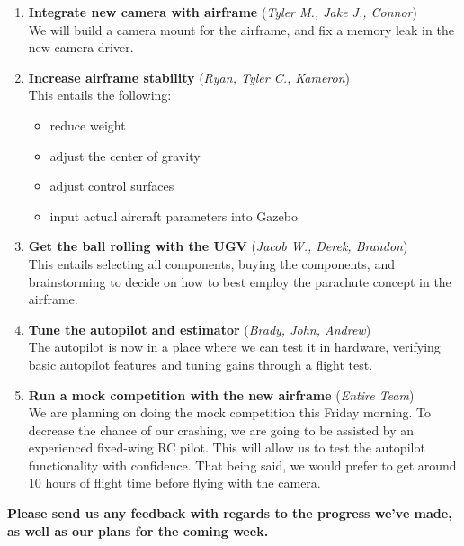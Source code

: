 \documentclass[]{../auvsi_doc}
\begin{document}
\begin{enumerate}
	\item \textbf{Integrate new camera with airframe} (\textit{Tyler M., Jake J., Connor}) \\
	We will build a camera mount for the airframe, and fix a memory leak in the new camera driver.
	\item \textbf{Increase airframe stability} (\textit{Ryan, Tyler C., Kameron}) \\
	This entails the following:
	\begin{itemize}
		\item reduce weight
		\item adjust the center of gravity
		\item adjust control surfaces
		\item input actual aircraft parameters into Gazebo
	\end{itemize}
	\item \textbf{Get the ball rolling with the UGV} (\textit{Jacob W., Derek, Brandon}) \\
	This entails selecting all components, buying the components, and brainstorming to decide on how to best employ the parachute concept in the airframe.
	\item \textbf{Tune the autopilot and estimator} (\textit{Brady, John, Andrew}) \\
	The autopilot is now in a place where we can test it in hardware, verifying basic autopilot features and tuning gains through a flight test.
	\item \textbf{Run a mock competition with the new airframe} (\textit{Entire Team}) \\
	We are planning on doing the mock competition this Friday morning. To decrease the chance of our crashing, we are going to be assisted by an experienced fixed-wing RC pilot. This will allow us to test the autopilot functionality with confidence. That being said, we would prefer to get around 10 hours of flight time before flying with the camera.
\end{enumerate}

\textbf{Please send us any feedback with regards to the progress we've made, as well as our plans for the coming week.}

%
%
%
\end{document}
